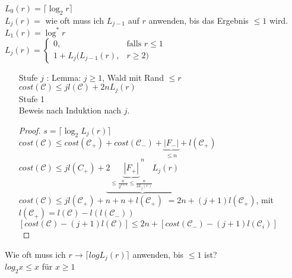 $L_0(r) = \lceil \log_2 r \rceil$\\
$L_j(r) = $ wie oft muss ich $L_{j-1}$ auf $r$ anwenden, bis das Ergebnis $\leq 1$ wird.\\
$L_1(r) = \log^* r$\\
$L_j(r) = \begin{cases} 0, &\text{falls } r \leq 1 \\ 1 + L_j(L_{j-1}(r), &r \geq 2) \end{cases}$
\begin{enumerate}
\item[Stufe $j$]: Lemma: $j \geq 1$, Wald mit Rand $\leq r$\\
$cost(\mathcal{C}) \leq j l (\mathcal{C}) + 2n L_j(r)$\\
Stufe 1 \checkmark \\
Beweis nach Induktion nach $j$.
\begin{proof}
$s = \lceil \log_2 L_j(r) \rceil$\\
$cost(\mathcal{C}) \leq cost(\mathcal{C}_+) + cost(\mathcal{C}_-) + \underbrace{ |F_-|}_{\leq n} + l(\mathcal{C_+})$
$cost(\mathcal{C}) \leq j l (C_{+}) + \underbrace{2 \underbrace{ |F_+| }_{ \leq \frac{n}{2^{s+1}} \leq \frac{n}{2L_j(r)}} L_j(r)}^n$
$cost(\mathcal{C}) \leq j l(\mathcal{C}_+) + n +n + l(\mathcal{C}_+)$
$=2n + (j+1) l(\mathcal{C}_+)$, mit $ l(\mathcal{C}_+) = l (\mathcal{C}) - l ( l(\mathcal{C}_-))$\\
$[cost(\mathcal{C})-(j+1)l(\mathcal{C})] \leq 2n + [cost(\mathcal{C}_-)-(j+1)l(\mathcal{C}_i)]$\\
\end{proof}
\end{enumerate}
Wie oft muss ich $r \rightarrow \lceil log L_j(r) \rceil$ anwenden, bis $\leq 1$ ist?\\
$log_2 x \leq x$ für $x \geq 1$\\